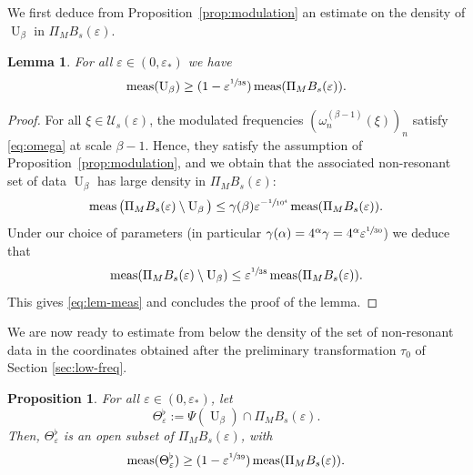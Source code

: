 \documentclass[10pt,a4paper]{amsart}
\theoremstyle{plain}
\newtheorem{proposition}[theorem]{Proposition}
\newtheorem{lemma}[theorem]{Lemma}
\theoremstyle{definition}
\DeclareMathOperator{\meas}{meas}
\newcommand{\1}{\mathbf{1}}
\let\epsilon\varepsilon
\begin{document}
We first deduce from Proposition~\ref{prop:modulation} an estimate on the density of $\operatorname{U}_{\beta}$ in $\Pi_{M}B_{s}(\epsilon)$.
\begin{lemma}
\label{lem:meas-}
For all $\epsilon\in(0,\epsilon_{\ast})$ we have
\begin{equation}
\label{eq:lem-meas}
\meas(\operatorname{U}_{\beta})
\geq
(1 - \epsilon^{\sfrac{1}{38}})
\meas(\Pi_{M}B_{s}(\epsilon)).
\end{equation}
\end{lemma}
\begin{proof}
For all $\xi\in\mathcal{U}_{s}(\epsilon)$, the modulated frequencies $(\omega_{n}^{(\beta-1)}(\xi))_{n}$ satisfy \eqref{eq:omega} at scale $\beta-1$. Hence, they satisfy the assumption of Proposition~\ref{prop:modulation}, and we obtain that the associated non-resonant set of data $\operatorname{U}_{\beta}$ has large density in $\Pi_{M}B_{s}(\epsilon)$:
\[
\meas\big(
\Pi_{M}B_{s}(\epsilon)\setminus \operatorname{U}_{\beta}
\big)
\leq
\gamma(\beta)\epsilon^{-\sfrac{1}{10^{4}}}\meas(\Pi_{M}B_{s}(\epsilon)).
\]
Under our choice of parameters (in particular $\gamma(\alpha)=4^{\alpha}\gamma=4^{\alpha}\epsilon^{\sfrac{1}{30}}$) we deduce that
\[
\meas(\Pi_{M}B_{s}(\epsilon)
\setminus\operatorname{U}_{\beta})
\leq
\epsilon^{\sfrac{1}{38}}\meas(\Pi_{M}B_{s}(\epsilon)).
\]
This gives \eqref{eq:lem-meas} and concludes the proof of the lemma.
\end{proof}
We are now ready to estimate from below the density of the set of non-resonant data in the coordinates obtained after the preliminary transformation $\tau_{0}$ of Section \ref{sec:low-freq}.
\begin{proposition}
\label{prop:xi0} For all $\epsilon\in(0,\epsilon_{\ast})$, let
\begin{equation}
\label{eq:theta}
\Theta_{\epsilon}^{\flat}
:=
\Psi(\operatorname{U}_{\beta})
\cap
\Pi_{M}B_{s}(\epsilon).
\end{equation}
Then, $\Theta_{\epsilon}^{\flat}$ is an open subset of $\Pi_{M}B_{s}(\epsilon)$, with
\begin{equation}
\meas(\Theta_{\epsilon}^{\flat})\geq(1-\epsilon^{\sfrac{1}{39}})\meas(\Pi_{M}B_{s}(\epsilon)).
\end{equation}
\end{proposition}
\end{document}

